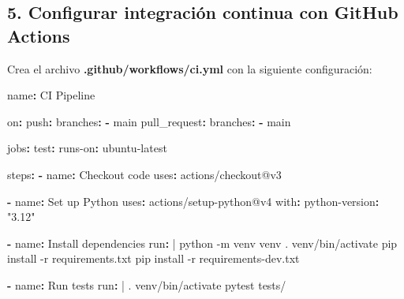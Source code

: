 \documentclass[
  a4paper,
  DIV=11,
  numbers=noendperiod,
  onepage,
  openany]{scrreprt}
\newenvironment{Shaded}{\begin{snugshade}}{\end{snugshade}}
\newcommand{\AttributeTok}[1]{\textcolor[rgb]{0.40,0.45,0.13}{#1}}
\newcommand{\CharTok}[1]{\textcolor[rgb]{0.13,0.47,0.30}{#1}}
\newcommand{\FunctionTok}[1]{\textcolor[rgb]{0.28,0.35,0.67}{#1}}
\newcommand{\KeywordTok}[1]{\textcolor[rgb]{0.00,0.23,0.31}{\textbf{#1}}}
\newcommand{\NormalTok}[1]{\textcolor[rgb]{0.00,0.23,0.31}{#1}}
\newcommand{\StringTok}[1]{\textcolor[rgb]{0.13,0.47,0.30}{#1}}
\begin{document}
\subsection{5. Configurar integración continua con GitHub
Actions}\label{configurar-integraciuxf3n-continua-con-github-actions}

Crea el archivo \textbf{.github/workflows/ci.yml} con la siguiente
configuración:

\begin{Shaded}
\begin{Highlighting}[]
\FunctionTok{name}\KeywordTok{:}\AttributeTok{ CI Pipeline}

\FunctionTok{on}\KeywordTok{:}
\AttributeTok{  }\FunctionTok{push}\KeywordTok{:}
\AttributeTok{    }\FunctionTok{branches}\KeywordTok{:}
\AttributeTok{      }\KeywordTok{{-}}\AttributeTok{ main}
\AttributeTok{  }\FunctionTok{pull\_request}\KeywordTok{:}
\AttributeTok{    }\FunctionTok{branches}\KeywordTok{:}
\AttributeTok{      }\KeywordTok{{-}}\AttributeTok{ main}

\FunctionTok{jobs}\KeywordTok{:}
\AttributeTok{  }\FunctionTok{test}\KeywordTok{:}
\AttributeTok{    }\FunctionTok{runs{-}on}\KeywordTok{:}\AttributeTok{ ubuntu{-}latest}

\AttributeTok{    }\FunctionTok{steps}\KeywordTok{:}
\AttributeTok{    }\KeywordTok{{-}}\AttributeTok{ }\FunctionTok{name}\KeywordTok{:}\AttributeTok{ Checkout code}
\AttributeTok{      }\FunctionTok{uses}\KeywordTok{:}\AttributeTok{ actions/checkout@v3}

\AttributeTok{    }\KeywordTok{{-}}\AttributeTok{ }\FunctionTok{name}\KeywordTok{:}\AttributeTok{ Set up Python}
\AttributeTok{      }\FunctionTok{uses}\KeywordTok{:}\AttributeTok{ actions/setup{-}python@v4}
\AttributeTok{      }\FunctionTok{with}\KeywordTok{:}
\AttributeTok{        }\FunctionTok{python{-}version}\KeywordTok{:}\AttributeTok{ }\StringTok{"3.12"}

\AttributeTok{    }\KeywordTok{{-}}\AttributeTok{ }\FunctionTok{name}\KeywordTok{:}\AttributeTok{ Install dependencies}
\FunctionTok{      run}\KeywordTok{: }\CharTok{|}
\NormalTok{        python {-}m venv venv}
\NormalTok{        . venv/bin/activate}
\NormalTok{        pip install {-}r requirements.txt}
\NormalTok{        pip install {-}r requirements{-}dev.txt}

\AttributeTok{    }\KeywordTok{{-}}\AttributeTok{ }\FunctionTok{name}\KeywordTok{:}\AttributeTok{ Run tests}
\FunctionTok{      run}\KeywordTok{: }\CharTok{|}
\NormalTok{        . venv/bin/activate}
\NormalTok{        pytest tests/}
\end{Highlighting}
\end{Shaded}
\end{document}
